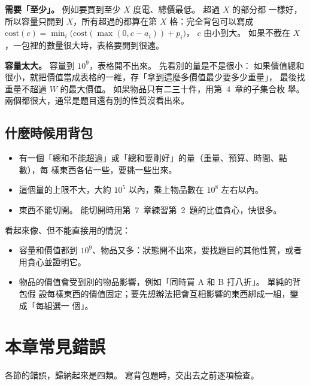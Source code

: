 \textbf{需要「至少」。} 例如要買到至少 $X$ 度電、總價最低。 超過 $X$ 的部分都
一樣好，所以容量只開到 $X$，所有超過的都算在第 $X$ 格：完全背包可以寫成
$\mathrm{cost}(c) = \min_i \bigl(\mathrm{cost}(\max(0, c - a_i)) + p_i\bigr)$，
$c$ 由小到大。 如果不截在 $X$，一包裡的數量很大時，表格要開到很遠。

\textbf{容量太大。} 容量到 $10^9$，表格開不出來。 先看別的量是不是很小：
如果價值總和很小，就把價值當成表格的一維，存「拿到這麼多價值最少要多少重量」，
最後找重量不超過 $W$ 的最大價值。 如果物品只有二三十件，用第~4~章的子集合枚
舉。 兩個都很大，通常是題目還有別的性質沒看出來。

\subsection{什麼時候用背包}

\begin{itemize}
\item 有一個「總和不能超過」或「總和要剛好」的量（重量、預算、時間、點數），每
樣東西各佔一些，要挑一些出來。
\item 這個量的上限不大，大約 $10^5$ 以內，乘上物品數在 $10^8$ 左右以內。
\item 東西不能切開。 能切開時用第~7~章練習第~2~題的比值貪心，快很多。
\end{itemize}

看起來像、但不能直接用的情況：

\begin{itemize}
\item 容量和價值都到 $10^9$、物品又多：狀態開不出來，要找題目的其他性質，或者
用貪心並證明它。
\item 物品的價值會受到別的物品影響，例如「同時買 A 和 B 打八折」。 單純的背包假
設每樣東西的價值固定；要先想辦法把會互相影響的東西綁成一組，變成「每組選一
個」。
\end{itemize}

\section{本章常見錯誤}
\label{sec:knap-pitfalls}

各節的錯誤，歸納起來是四類。 寫背包題時，交出去之前逐項檢查。

